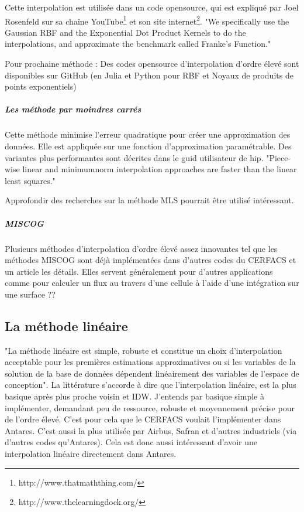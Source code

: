 Cette interpolation est utilisée dans un code opensource, qui est expliqué par Joel Rosenfeld sur sa chaîne YouTube\footnote{http://www.thatmaththing.com/} et son site internet\footnote{http://www.thelearningdock.org/}. "We specifically use the Gaussian RBF and the Exponential Dot Product Kernels to do the interpolations, and approximate the benchmark called Franke's Function."\cite{opensource_2}

Pour prochaine méthode : Des codes opensource d'interpolation d'ordre élevé sont disponibles sur GitHub (en Julia\cite{opensource} et Python\cite{opensource_2} pour RBF et Noyaux de produits de points exponentiels)

\subparagraph{Les méthode par moindres carrés}\label{mc}

Cette méthode minimise l'erreur quadratique pour créer une approximation des données. Elle est appliquée sur une fonction d'approximation paramétrable. Des variantes plus performantes sont décrites dans le guid utilisateur de hip.
"Piece-wise linear and minimumnorm interpolation approaches are faster than the linear least squares."\cite{muller2020}


Approfondir des recherches sur la méthode \ac{MLS}\cite{MLS}\cite{levin}  pourrait être utilisé intéressant.

\subparagraph{MISCOG}

Plusieurs méthodes d'interpolation d'ordre élevé assez innovantes tel que les méthodes \ac{MISCOG} sont déjà implémentées dans d'autres codes du CERFACS et un article les détails\cite{laborderie2018}. Elles servent généralement pour d'autres applications comme pour calculer un flux au travers d'une cellule à l'aide d'une intégration sur une surface ?? %


\subsection{La méthode linéaire}
"La méthode linéaire est simple, robuste et constitue un choix d'interpolation acceptable pour les premières estimations approximatives ou si les variables de la solution de la base de données dépendent linéairement des variables de l'espace de conception"\cite{palmer2009}.
La littérature\cite{fluidssengineer} s'accorde à dire que l'interpolation linéaire, est la plus basique après plus proche voisin et IDW. J'entends par basique simple à implémenter, demandant peu de ressource, robuste et moyennement précise pour de l'ordre élevé. C'est pour cela que le CERFACS voulait l'implémenter dans Antares. C'est aussi la plus utilisée par Airbus, Safran et d'autres industriels (via d'autres codes qu'Antares). Cela est donc aussi intéressant d'avoir une interpolation linéaire directement dans Antares.

